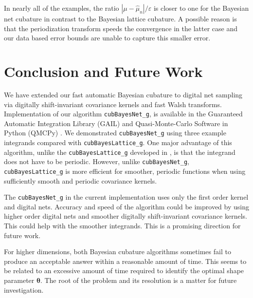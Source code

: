 \documentclass[graybox,footinfo]{svmult}
\newcommand{\abs}[1]{\left\lvert #1 \right\rvert} %
\begin{document}
In nearly all of the examples, the ratio $\abs{\mu - \widehat{\mu}_n}/\varepsilon$  is closer to one for the Bayesian net cubature in contrast to the Bayesian lattice cubature.  
A possible reason is that the periodization transform speeds the convergence in the latter case and our data based error bounds are unable to capture this smaller error. 





\section{Conclusion and Future Work}
\label{FJ:sec:conclusion-future-work}

We have extended our fast automatic Bayesian cubature to digital net sampling via digitally shift-invariant covariance kernels and fast Walsh transforms.  Implementation of our algorithm \texttt{cubBayesNet\_g}, is available in the Guaranteed Automatic Integration Library (GAIL) \cite{ChoEtal21a} and Quasi-Monte-Carlo Software in Python (QMCPy) \cite{QMCPy2020a}.  We demonstrated \texttt{cubBayesNet\_g} using three example integrands compared with \texttt{cubBayesLattice\_g}. 
One major advantage of this algorithm, unlike the \texttt{cubBayesLattice\_g} developed in \cite{RatHic19a}, is that the integrand does not have to be periodic.  However, unlike \texttt{cubBayesNet\_g}, \texttt{cubBayesLattice\_g} is more efficient for smoother, periodic functions when using sufficiently smooth and periodic covariance kernels.

The \texttt{cubBayesNet\_g} in the current implementation uses only the first order kernel and digital nets. Accuracy and speed of the algorithm could be improved by using higher order digital nets and smoother digitally shift-invariant covariance kernels. This could help with the smoother integrands. This is a promising direction for future work.

For higher dimensions, both Bayesian cubature algorithms  sometimes fail to produce an acceptable answer within a reasonable amount of time.  This seems to be related to an excessive amount of time required to identify the optimal shape parameter $\boldsymbol{\theta}$.  The root of the problem and its resolution is a matter for future investigation.






\end{document}
